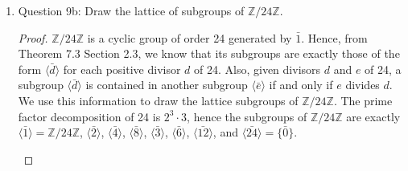 \documentclass{article}
\begin{document}
\begin{enumerate}
\begin{enumerate}
      \item Question 9b: Draw the lattice of subgroups of
        $\mathbb{Z}/24\mathbb{Z}$.
        \begin{proof}
          $\mathbb{Z}/24\mathbb{Z}$ is a cyclic group of order 24 generated
          by $\bar{1}$. Hence, from Theorem 7.3 Section 2.3, we know that
          its subgroups are exactly those of the form
          $\langle\bar{d}\rangle$ for each positive divisor $d$ of 24. Also,
          given divisors $d$ and $e$ of 24, a subgroup
          $\langle\bar{d}\rangle$ is contained in another subgroup
          $\langle\bar{e}\rangle$ if and only if $e$ divides $d$. We use
          this information to draw the lattice subgroups of
          $\mathbb{Z}/24\mathbb{Z}$. The prime factor decomposition of 24
          is $2^3\cdot3$, hence the subgroups of $\mathbb{Z}/24\mathbb{Z}$
          are exactly $\langle\bar{1}\rangle=\mathbb{Z}/24\mathbb{Z}$,
          $\langle\bar{2}\rangle$, $\langle\bar{4}\rangle$,
          $\langle\bar{8}\rangle$, $\langle\bar{3}\rangle$,
          $\langle\bar{6}\rangle$, $\langle\bar{12}\rangle$, and
          $\langle\bar{24}\rangle=\{\bar{0}\}$.

          \begin{center}
          \end{center}



\end{proof}
\end{enumerate}
\end{enumerate}
\end{document}
